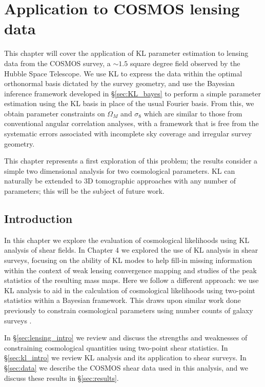 \chapter{Application to COSMOS lensing data}

This chapter will cover the application of KL parameter estimation to
lensing data from the COSMOS survey, a $\sim 1.5$ square degree field
observed by the Hubble Space Telescope. We use KL to express the data
within the optimal orthonormal basis dictated by the 
survey geometry, and use the Bayesian inference framework developed in
\S\ref{sec:KL_bayes} to perform a simple parameter estimation using
the KL basis in place of the usual Fourier basis.  From this, we obtain
parameter constraints on $\Omega_M$ and $\sigma_8$ which are similar to
those from conventional angular correlation analyses, with a framework that
is free from the systematic errors associated with incomplete sky coverage
and irregular survey geometry.

This chapter represents a first exploration of this problem; the results
consider a simple two dimensional analysis for two cosmological parameters.
KL can naturally be extended to 3D tomographic approaches with any number of
parameters; this will be the subject of future work.

\section{Introduction}
\label{sec:introduction}

In this chapter we explore the evaluation of cosmological
likelihoods using KL analysis of shear fields.  
In Chapter 4 we explored the use of KL analysis in shear surveys,
focusing on the ability of
KL modes to help fill-in missing information within the context of weak
lensing convergence mapping and studies of the peak statistics of the
resulting mass maps.
Here we follow a different approach:
we use KL analysis to aid in the calculation of cosmological likelihoods
using two-point statistics within a Bayesian framework.
This draws upon similar work done
previously to constrain cosmological parameters using number counts of
galaxy surveys \citep{Vogeley96, Pope04}.

In \S\ref{sec:lensing_intro} we review and discuss the strengths and
weaknesses of constraining cosmological quantities using two-point shear
statistics. In \S\ref{sec:kl_intro} we review KL analysis and its application
to shear surveys.  In \S\ref{sec:data} we describe the COSMOS shear data
used in this analysis, and we discuss these results in \S\ref{sec:results}.

